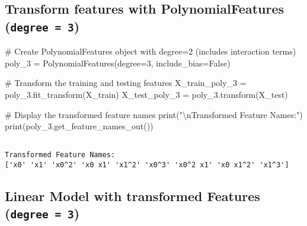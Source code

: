 \documentclass[
  letterpaper,
  DIV=11,
  numbers=noendperiod]{scrreprt}
\newenvironment{Shaded}{\begin{snugshade}}{\end{snugshade}}
\newcommand{\BuiltInTok}[1]{\textcolor[rgb]{0.00,0.23,0.31}{#1}}
\newcommand{\CharTok}[1]{\textcolor[rgb]{0.13,0.47,0.30}{#1}}
\newcommand{\CommentTok}[1]{\textcolor[rgb]{0.37,0.37,0.37}{#1}}
\newcommand{\DecValTok}[1]{\textcolor[rgb]{0.68,0.00,0.00}{#1}}
\newcommand{\NormalTok}[1]{\textcolor[rgb]{0.00,0.23,0.31}{#1}}
\newcommand{\OperatorTok}[1]{\textcolor[rgb]{0.37,0.37,0.37}{#1}}
\newcommand{\StringTok}[1]{\textcolor[rgb]{0.13,0.47,0.30}{#1}}
\newcommand{\VariableTok}[1]{\textcolor[rgb]{0.07,0.07,0.07}{#1}}
\begin{document}
\subsection{\texorpdfstring{Transform features with PolynomialFeatures
(\texttt{degree\ =\ 3})}{Transform features with PolynomialFeatures (degree = 3)}}\label{transform-features-with-polynomialfeatures-degree-3}

\begin{Shaded}
\begin{Highlighting}[]
\CommentTok{\# Create PolynomialFeatures object with degree=2 (includes interaction terms)}
\NormalTok{poly\_3 }\OperatorTok{=}\NormalTok{ PolynomialFeatures(degree}\OperatorTok{=}\DecValTok{3}\NormalTok{, include\_bias}\OperatorTok{=}\VariableTok{False}\NormalTok{)}

\CommentTok{\# Transform the training and testing features}
\NormalTok{X\_train\_poly\_3 }\OperatorTok{=}\NormalTok{ poly\_3.fit\_transform(X\_train)}
\NormalTok{X\_test\_poly\_3 }\OperatorTok{=}\NormalTok{ poly\_3.transform(X\_test)}

\CommentTok{\# Display the transformed feature names}
\BuiltInTok{print}\NormalTok{(}\StringTok{"}\CharTok{\textbackslash{}n}\StringTok{Transformed Feature Names:"}\NormalTok{)}
\BuiltInTok{print}\NormalTok{(poly\_3.get\_feature\_names\_out())}
\end{Highlighting}
\end{Shaded}

\begin{verbatim}

Transformed Feature Names:
['x0' 'x1' 'x0^2' 'x0 x1' 'x1^2' 'x0^3' 'x0^2 x1' 'x0 x1^2' 'x1^3']
\end{verbatim}

\subsection{\texorpdfstring{Linear Model with transformed Features
(\texttt{degree\ =\ 3})}{Linear Model with transformed Features (degree = 3)}}\label{linear-model-with-transformed-features-degree-3}
\end{document}
